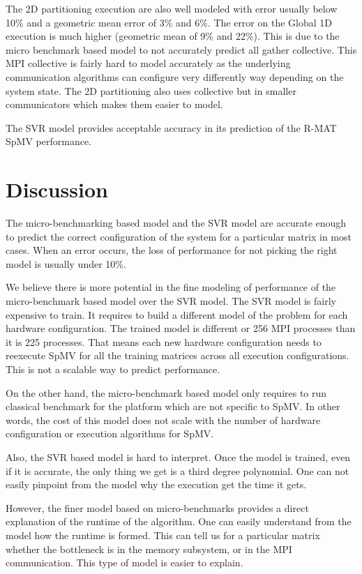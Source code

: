 \documentclass[sigconf,review,anonymous]{acmart}
\begin{document}
The 2D partitioning execution are also well modeled with error usually
below 10\% and a geometric mean error of 3\% and 6\%. The error on the
Global 1D execution is much higher (geometric mean of 9\% and
22\%). This is due to the micro benchmark based model to not
accurately predict all gather collective. This MPI collective is
fairly hard to model accurately as the underlying communication
algorithms can configure very differently way depending on the system
state. The 2D partitioning also uses collective but in smaller
communicators which makes them easier to model.

The SVR model provides acceptable accuracy in its prediction of the
R-MAT SpMV performance.





\section{Discussion}
\label{sec:discussion}

The micro-benchmarking based model and the SVR model are accurate
enough to predict the correct configuration of the system for a
particular matrix in most cases. When an error occurs, the loss of
performance for not picking the right model is usually under 10\%.

We believe there is more potential in the fine modeling of performance
of the micro-benchmark based model over the SVR model. The SVR model
is fairly expensive to train. It requires to build a different model
of the problem for each hardware configuration. The trained model is
different or 256 MPI processes than it is 225 processes. That means
each new hardware configuration needs to reexecute SpMV for all the
training matrices across all execution configurations. This is not a
scalable way to predict performance.

On the other hand, the micro-benchmark based model only requires to
run classical benchmark for the platform which are not specific to
SpMV. In other words, the cost of this model does not scale with the
number of hardware configuration or execution algorithms for SpMV.

Also, the SVR based model is hard to interpret. Once the model is
trained, even if it is accurate, the only thing we get is a third
degree polynomial. One can not easily pinpoint from the model why the
execution get the time it gets.

However, the finer model based on micro-benchmarks provides a direct
explanation of the runtime of the algorithm. One can easily understand
from the model how the runtime is formed. This can tell us for a
particular matrix whether the bottleneck is in the memory subsystem,
or in the MPI communication. This type of model is easier to explain.
\end{document}
